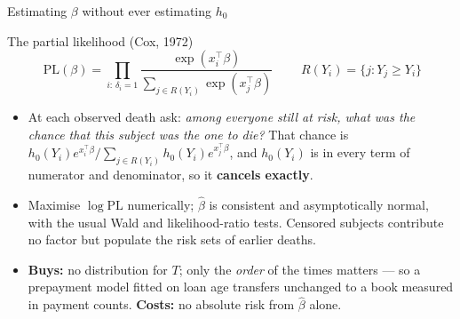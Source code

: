 \documentclass[aspectratio=169,11pt]{beamer}
\begin{document}
\begin{frame}{Estimating $\beta$ without ever estimating $h_0$}
  \scriptsize
  \begin{block}{The partial likelihood (Cox, 1972)}
    \[
      \boxed{\;
        \mathrm{PL}(\beta)=\prod_{i:\,\delta_i=1}
        \frac{\exp(x_i^{\top}\beta)}
             {\sum_{j\in R(Y_i)}\exp(x_j^{\top}\beta)}\;}
      \qquad R(Y_i)=\{j: Y_j\ge Y_i\}
    \]
  \end{block}
  \begin{readme}
    \begin{itemize}
      \item At each observed death ask: \emph{among everyone still at risk, what was the
            chance that this subject was the one to die?} That chance is
            $h_0(Y_i)e^{x_i^\top\beta}\big/\sum_{j\in R(Y_i)}h_0(Y_i)e^{x_j^\top\beta}$,
            and $h_0(Y_i)$ is in every term of numerator and denominator, so it
            \textbf{cancels exactly}.
      \item Maximise $\log \mathrm{PL}$ numerically; $\hat\beta$ is consistent and
            asymptotically normal, with the usual Wald and likelihood-ratio tests. Censored
            subjects contribute no factor but populate the risk sets of earlier deaths.
      \item \textbf{Buys:} no distribution for $T$; only the \emph{order} of the times
            matters --- so a prepayment model fitted on loan age transfers unchanged to a
            book measured in payment counts. \textbf{Costs:} no absolute risk from
            $\hat\beta$ alone.
    \end{itemize}
  \end{readme}
\end{frame}
\end{document}
